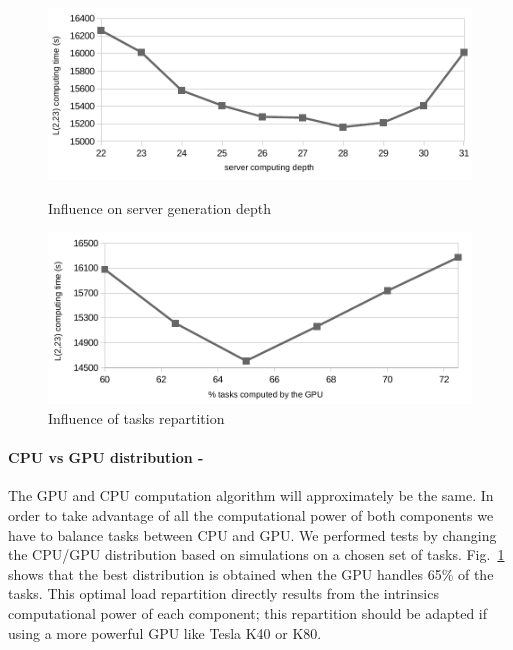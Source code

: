 \begin{figure}[htb]
\begin{minipage}[b]{0.5\linewidth}

\centering 
\includegraphics[scale=.5]{figures/langford/graphe_prof}
\caption{Influence on server generation depth}
\label{fig:graphe_prof}

\end{minipage}
\begin{minipage}[b]{0.5\linewidth}

\centering
\includegraphics[scale=.5]{figures/langford/graphe_cpu_gpu}
\caption{Influence of tasks repartition}
\label{fig:graphe_rep}

\end{minipage}
\end{figure}

\paragraph{CPU vs GPU distribution -}
The GPU and CPU computation algorithm will approximately be the same. 
In order to take advantage of all the computational power of both components we have to balance tasks between CPU and GPU. 
We performed tests by changing the CPU/GPU distribution based on simulations on a chosen set of tasks.  
Fig.~\ref{fig:graphe_rep} shows that the best distribution is obtained when the GPU handles 65\% of the tasks. 
This optimal load repartition directly results from the intrinsics computational power of each component; this repartition should be adapted if using a more powerful GPU like Tesla K40 or K80.

